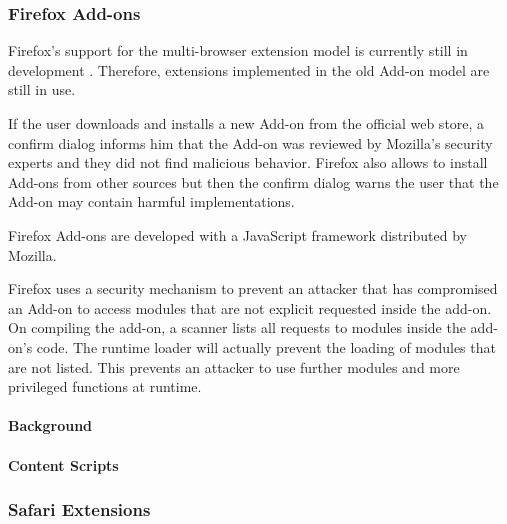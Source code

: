 {\subsubsection{Firefox Add-ons}

	Firefox's support for the multi-browser extension model is currently still in development \cite{mozillaWebExtensionStatus}. Therefore, extensions implemented in the old Add-on model are still in use. 
	
	If the user downloads and installs a new Add-on from the official web store, a confirm dialog informs him that the Add-on was reviewed by Mozilla's security experts and they did not find malicious behavior. Firefox also allows to install Add-ons from other sources but then the confirm dialog warns the user that the Add-on may contain harmful implementations.
	
	
	Firefox Add-ons are developed with a JavaScript framework distributed by Mozilla. 


	
	Firefox uses a security mechanism to prevent an attacker that has compromised an Add-on to access modules that are not explicit requested inside the add-on. On compiling the add-on, a scanner lists all requests to modules inside the add-on's code. The runtime loader will actually prevent the loading of modules that are not listed. This prevents an attacker to use further modules and more privileged functions at runtime.
	
\paragraph{Background}

	

\paragraph{Content Scripts}


\subsubsection{Safari Extensions}

}
